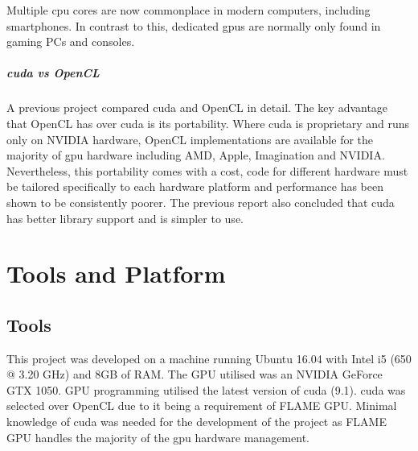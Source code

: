 \documentclass{UoYCSproject}
\begin{document}

Multiple \acrshort{cpu} cores are now commonplace in modern computers, including smartphones.
In contrast to this, dedicated \acrshort{gpu}s are normally only found in gaming PCs and consoles.

\paragraph{\acrshort{cuda} vs OpenCL}
A previous project compared \acrshort{cuda} and OpenCL in detail.
The key advantage that OpenCL has over \acrshort{cuda} is its portability.
Where \acrshort{cuda} is proprietary and runs only on NVIDIA hardware, OpenCL implementations are available for the majority of \gls{gpu} hardware including AMD, Apple\cite{apple_opencl}, Imagination and NVIDIA.\cite{opencl_conformance}
Nevertheless, this portability comes with a cost, code for different hardware must be tailored specifically to each hardware platform and performance has been shown to be consistently poorer\cite{cuda_v_opencl}.
The previous report also concluded that \gls{cuda} has better library support and is simpler to use\cite{phil_diss}.


\chapter{Tools and Platform}
\section{Tools}
This project was developed on a machine running Ubuntu 16.04 with Intel i5 (650 @ 3.20 GHz) and 8GB of RAM.
The GPU utilised was an NVIDIA GeForce GTX 1050.
GPU programming utilised the latest version of \gls{cuda} (9.1).
\gls{cuda} was selected over OpenCL due to it being a requirement of \gls{FLAME GPU}.
Minimal knowledge of \gls{cuda} was needed for the development of the project as \gls{FLAME GPU} handles the majority of the \gls{gpu} hardware management.
\end{document}
